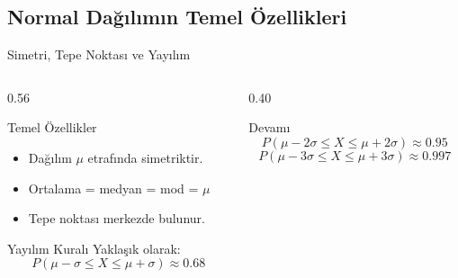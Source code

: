 \documentclass[light]{lutbeamer}
\begin{document}
\subsection{Normal Dağılımın Temel Özellikleri}

\begin{frame}{Simetri, Tepe Noktası ve Yayılım}
\small
\begin{columns}[T,onlytextwidth]
    \begin{column}{0.56\textwidth}
        \begin{block}{Temel Özellikler}
            \begin{itemize}
                \item Dağılım $\mu$ etrafında simetriktir.
                \item Ortalama = medyan = mod = $\mu$
                \item Tepe noktası merkezde bulunur.
            \end{itemize}
        \end{block}

        \begin{block}{Yayılım Kuralı}
            Yaklaşık olarak:
            \[
            P(\mu-\sigma \le X \le \mu+\sigma) \approx 0.68
            \]
        \end{block}
    \end{column}
    \begin{column}{0.40\textwidth}
        \begin{exampleblock}{Devamı}
            \[
            P(\mu-2\sigma \le X \le \mu+2\sigma) \approx 0.95
            \]
            \[
            P(\mu-3\sigma \le X \le \mu+3\sigma) \approx 0.997
            \]
        \end{exampleblock}
    \end{column}
\end{columns}
\end{frame}
\end{document}
